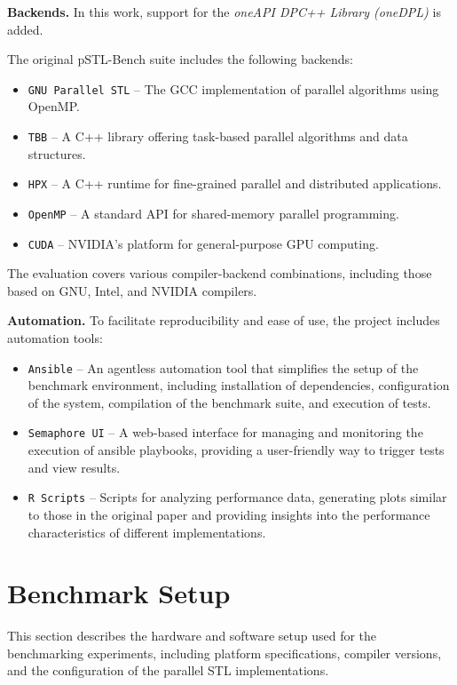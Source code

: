 \documentclass[sigconf]{acmart}
\newcommand{\mypar}[1]{{\bf #1.}}
\begin{document}
\mypar{Backends} In this work, support for the \textit{oneAPI DPC++ Library (oneDPL)} is added.

The original pSTL-Bench suite includes the following backends:
\begin{itemize}
      \item \texttt{GNU Parallel STL} – The GCC implementation of parallel algorithms using OpenMP.
      \item \texttt{TBB} – A C++ library offering task-based parallel algorithms and data structures.
      \item \texttt{HPX} – A C++ runtime for fine-grained parallel and distributed applications.
      \item \texttt{OpenMP} – A standard API for shared-memory parallel programming.
      \item \texttt{CUDA} – NVIDIA’s platform for general-purpose GPU computing.
\end{itemize}

The evaluation covers various compiler-backend combinations, including those
based on GNU, Intel, and NVIDIA compilers.

\mypar{Automation} To facilitate reproducibility and ease of use, the project includes automation tools:
\begin{itemize}
      \item \texttt{Ansible} – An agentless automation tool that simplifies the setup of the benchmark environment,
            including installation of dependencies, configuration of the system, compilation of the benchmark suite, and execution of tests.
      \item \texttt{Semaphore UI} – A web-based interface for managing and monitoring the execution of ansible playbooks,
            providing a user-friendly way to trigger tests and view results.
      \item \texttt{R Scripts} – Scripts for analyzing performance data, generating plots similar to those in the original paper
            and providing insights into the performance characteristics of different implementations.
\end{itemize}

\section{Benchmark Setup}\label{sec:benchmark_setup}

This section describes the hardware and software setup used for the
benchmarking experiments, including platform specifications, compiler versions,
and the configuration of the parallel STL implementations.
\end{document}
